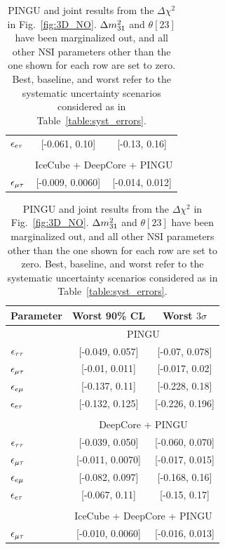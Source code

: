 {{\begin{table}
\begin{tabular}{lcc}
      $\epsilon_{e\tau}$ &   [-0.061, 0.10] &  [-0.13, 0.16] \\\\
      & \multicolumn{2}{c}{IceCube + DeepCore + PINGU}  \\
      $\epsilon_{\mu\tau}$ &  [-0.009, 0.0060] &  [-0.014, 0.012] \\
      \hline
   \end{tabular}
   \begin{tabular}{lcc}
      \hline 
      Parameter & Worst 90\% CL & Worst $3\sigma$\\
      \hline & \multicolumn{2}{c}{PINGU} \\
      $\epsilon_{\tau\tau}$ &  [-0.049, 0.057] &   [-0.07, 0.078] \\
      $\epsilon_{\mu\tau}$ &   [-0.01, 0.011] &   [-0.017, 0.02] \\
      $\epsilon_{e\mu}$ &   [-0.137, 0.11] &   [-0.228, 0.18] \\
      $\epsilon_{e\tau}$ &  [-0.132, 0.125] &  [-0.226, 0.196] \\\\
      & \multicolumn{2}{c}{DeepCore + PINGU} \\
      $\epsilon_{\tau\tau}$ &   [-0.039, 0.050] &    [-0.060, 0.070] \\
      $\epsilon_{\mu\tau}$ &  [-0.011, 0.0070] &  [-0.017, 0.015] \\
      $\epsilon_{e\mu}$ &  [-0.082, 0.097] &  [-0.168, 0.16] \\
      $\epsilon_{e\tau}$ &  [-0.067, 0.11] &  [-0.15, 0.17] \\\\
      & \multicolumn{2}{c}{IceCube + DeepCore + PINGU}  \\
      $\epsilon_{\mu\tau}$ &   [-0.010, 0.0060] &  [-0.016, 0.013] \\
      \hline
   \end{tabular}
   \caption{PINGU and joint results from the $\Delta \chi^2$ in Fig.~\ref{fig:3D_NO}. $\dm[31]$ and $\theta[23]$ have been marginalized out, and all other NSI parameters other than the one shown for each row are set to zero.
   Best, baseline, and worst refer to 
   the systematic uncertainty scenarios considered as in Table~\ref{table:syst_errors}.}\label{table:PINGU_joint_results}
\end{table}


}}
